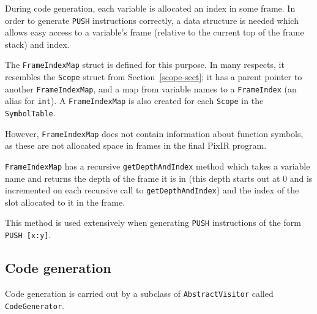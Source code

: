 \documentclass[11pt,a4paper]{scrartcl}
\begin{document}
During code generation, each variable is allocated an index in some frame. In order to generate \verb|PUSH| instructions correctly, a data structure is needed which allows easy access to a variable's frame (relative to the current top of the frame stack) and index.

The \verb|FrameIndexMap| struct is defined for this purpose. In many respects, it resembles the \verb|Scope| struct from Section~\ref{scope-sect}; it has a parent pointer to another \verb|FrameIndexMap|, and a map from variable names to a \verb|FrameIndex| (an alias for \verb|int|). A \verb|FrameIndexMap| is also created for each \verb|Scope| in the \verb|SymbolTable|.

However, \verb|FrameIndexMap| does not contain information about function symbols, as these are not allocated space in frames in the final PixIR program.

\verb|FrameIndexMap| has a recursive \verb|getDepthAndIndex| method which takes a variable name and returns the depth of the frame it is in (this depth starts out at $0$ and is incremented on each recursive call to \verb|getDepthAndIndex|) and the index of the slot allocated to it in the frame.

This method is used extensively when generating \verb|PUSH| instructions of the form \verb|PUSH [x:y]|.

\subsection{Code generation}

Code generation is carried out by a subclass of \verb|AbstractVisitor| called \verb|CodeGenerator|.
\end{document}
